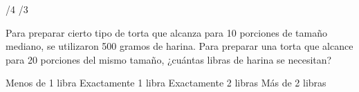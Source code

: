 \documentclass[10pt,letterpaper,addpoints]{exam}
\begin{document}
\begin{questions}
\begin{multicols}{2}
\begin{oneparchoices}
    /4
    /3
\end{oneparchoices}
\question Para preparar cierto tipo de torta que alcanza para 10 porciones de tamaño mediano, se utilizaron 500 gramos de harina. Para preparar una torta que alcance para 20 porciones del mismo tamaño, ¿cuántas libras de harina se necesitan?

\begin{choices}
    \choice Menos de 1 libra
    \choice Exactamente 1 libra
    \CorrectChoice Exactamente 2 libras
    \choice Más de 2 libras
\end{choices}

\end{multicols}
\end{questions}
\end{document}
